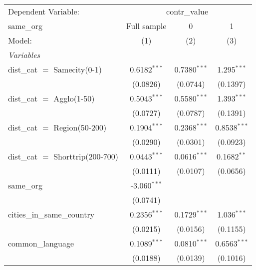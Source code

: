 \begingroup
\centering
\begin{tabular}{lccc}
   \tabularnewline \midrule \midrule
   Dependent Variable: & \multicolumn{3}{c}{contr\_value}\\
   same\_org                                              & Full sample     & 0               & 1 \\   
   Model:                                                 & (1)             & (2)             & (3)\\  
   \midrule
   \emph{Variables}\\
   dist\_cat $=$ Samecity(0-1)                            & 0.6182$^{***}$  & 0.7380$^{***}$  & 1.295$^{***}$\\   
                                                          & (0.0826)        & (0.0744)        & (0.1397)\\   
   dist\_cat $=$ Agglo(1-50)                              & 0.5043$^{***}$  & 0.5580$^{***}$  & 1.393$^{***}$\\   
                                                          & (0.0727)        & (0.0787)        & (0.1391)\\   
   dist\_cat $=$ Region(50-200)                           & 0.1904$^{***}$  & 0.2368$^{***}$  & 0.8538$^{***}$\\   
                                                          & (0.0290)        & (0.0301)        & (0.0923)\\   
   dist\_cat $=$ Shorttrip(200-700)                       & 0.0443$^{***}$  & 0.0616$^{***}$  & 0.1682$^{**}$\\   
                                                          & (0.0111)        & (0.0107)        & (0.0656)\\   
   same\_org                                              & -3.060$^{***}$  &                 &   \\   
                                                          & (0.0741)        &                 &   \\   
   cities\_in\_same\_country                              & 0.2356$^{***}$  & 0.1729$^{***}$  & 1.036$^{***}$\\   
                                                          & (0.0215)        & (0.0156)        & (0.1155)\\   
   common\_language                                       & 0.1089$^{***}$  & 0.0810$^{***}$  & 0.6563$^{***}$\\   
                                                          & (0.0188)        & (0.0139)        & (0.1016)\\   

\end{tabular}
